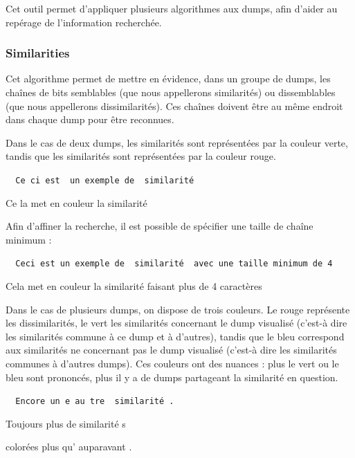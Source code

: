 Cet outil permet d'appliquer plusieurs algorithmes aux dumps, afin d'aider au repérage de l'information recherchée.

\subsubsection{Similarities}

Cet algorithme permet de mettre en évidence, dans un groupe de dumps, les chaînes de bits semblables (que nous appellerons similarités) ou dissemblables (que nous appellerons dissimilarités). Ces chaînes doivent être au même endroit dans chaque dump pour être reconnues.

Dans le cas de deux dumps, les similarités sont représentées par la couleur verte, tandis que les similarités sont représentées par la couleur rouge.

\begin{center}
{\tt
{\color{simColor} Ce}{\color{dissimColor} ci es}{\color{simColor}t }{\color{dissimColor} un exemple de }{\color{simColor} similarité}

{\color{simColor} Ce}{\color{dissimColor} la me}{\color{simColor}t }{\color{dissimColor} en couleur la }{\color{simColor} similarité}
}
\end{center}

Afin d'affiner la recherche, il est possible de spécifier une taille de chaîne minimum :

\begin{center}
{\tt
{\color{dissimColor} Ceci est un exemple de }{\color{simColor} similarité }{\color{dissimColor} avec une taille minimum de 4}

{\color{dissimColor} Cela met en couleur la }{\color{simColor} similarité }{\color{dissimColor} faisant plus de 4 caractères}
}
\end{center}


Dans le cas de plusieurs dumps, on dispose de trois couleurs. Le rouge représente les dissimilarités, le vert les similarités concernant le dump visualisé (c'est-à dire les similarités commune à ce dump et à d'autres), tandis que le bleu correspond aux similarités ne concernant pas le dump visualisé (c'est-à dire les similarités communes à d'autres dumps).
Ces couleurs ont des nuances : plus le vert ou le bleu sont prononcés, plus il y a de dumps partageant la similarité en question.

\begin{center}
{\tt
{\color{dissimColor} Encore un}{\color{otherSimColor} e au}{\color{dissimColor} tre }{\color{simColor} similarité}{\color{dissimColor} .}

{\color{dissimColor} Toujours }{\color{simColor} plus }{\color{dissimColor} de }{\color{simColor} similarité}{\color{dissimColor} s}

{\color{dissimColor} colorées }{\color{simColor} plus }{\color{dissimColor} qu'}{\color{otherSimColor} auparavant}{\color{dissimColor} .}
}
\end{center}


